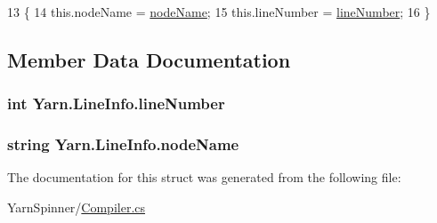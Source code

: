 \begin{DoxyCode}
13         \{
14             this.nodeName = \hyperlink{a00105_a5a91331fb123e29d71d69e096f943c2f}{nodeName};
15             this.lineNumber = \hyperlink{a00105_a7165cafce64a3deafc41b2090ddf8d0e}{lineNumber};
16         \}
\end{DoxyCode}


\subsection{Member Data Documentation}
\hypertarget{a00105_a7165cafce64a3deafc41b2090ddf8d0e}{
\subsubsection[{line\-Number}]{\setlength{\rightskip}{0pt plus 5cm}int Yarn.\-Line\-Info.\-line\-Number}}\label{a00105_a7165cafce64a3deafc41b2090ddf8d0e}
\hypertarget{a00105_a5a91331fb123e29d71d69e096f943c2f}{
\subsubsection[{node\-Name}]{\setlength{\rightskip}{0pt plus 5cm}string Yarn.\-Line\-Info.\-node\-Name}}\label{a00105_a5a91331fb123e29d71d69e096f943c2f}


The documentation for this struct was generated from the following file\-:\begin{DoxyCompactItemize}
\item 
Yarn\-Spinner/\hyperlink{a00264}{Compiler.\-cs}\end{DoxyCompactItemize}
